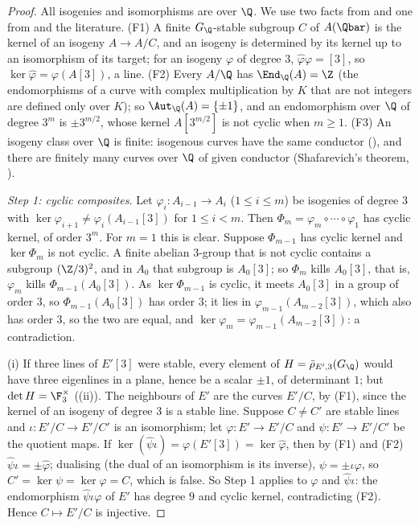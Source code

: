 \begin{proof}
All isogenies and isomorphisms are over $\Q$. We use two facts from  and one from  and the literature. (F1) A finite $G_\Q$-stable subgroup $C$ of $A(\Qbar)$ is the
kernel of an isogeny $A\to A/C$, and an isogeny is determined by its kernel up to an isomorphism of its target; for an isogeny $\varphi$ of degree $3$,
$\hat\varphi\varphi=[3]$, so $\ker\hat\varphi=\varphi(A[3])$, a line. (F2) Every $A/\Q$ has $\End_\Q(A)=\Z$ (the endomorphisms of a curve with complex
multiplication by $K$ that are not integers are defined only over $K$); so $\Aut_\Q(A)=\{\pm1\}$, and an endomorphism over $\Q$ of degree $3^m$ is
$\pm3^{m/2}$, whose kernel $A[3^{m/2}]$ is not cyclic when $m\ge1$. (F3) An isogeny class over $\Q$ is finite: isogenous curves have the same
conductor (), and there are finitely many curves over $\Q$ of given conductor (Shafarevich's theorem, \cite[Section IX.6]{SilvermanAEC}).

\emph{Step 1: cyclic composites.} Let $\varphi_i\colon A_{i-1}\to A_i$ ($1\le i\le m$) be isogenies of degree $3$ with $\ker\varphi_{i+1}\ne\varphi_i(A_{i-1}[3])$ for
$1\le i<m$. Then $\Phi_m=\varphi_m\circ\cdots\circ\varphi_1$ has cyclic kernel, of order $3^m$. For $m=1$ this is clear. Suppose $\Phi_{m-1}$ has cyclic
kernel and $\ker\Phi_m$ is not cyclic. A finite abelian $3$-group that is not cyclic contains a subgroup $(\Z/3)^2$, and in $A_0$ that subgroup is
$A_0[3]$; so $\Phi_m$ kills $A_0[3]$, that is, $\varphi_m$ kills $\Phi_{m-1}(A_0[3])$. As $\ker\Phi_{m-1}$ is cyclic, it meets $A_0[3]$ in a group of
order $3$, so $\Phi_{m-1}(A_0[3])$ has order $3$; it lies in $\varphi_{m-1}(A_{m-2}[3])$, which also has order $3$, so the two are equal, and
$\ker\varphi_m=\varphi_{m-1}(A_{m-2}[3])$: a contradiction.

(i) If three lines of $E'[3]$ were stable, every element of $H=\bar\rho_{E',3}(G_\Q)$ would have three eigenlines in a plane, hence be a scalar
$\pm1$, of determinant $1$; but $\det H=\F_3^\times$ ((ii)). The neighbours of $E'$ are the curves $E'/C$, by (F1), since the
kernel of an isogeny of degree $3$ is a stable line. Suppose $C\ne C'$ are stable lines and $\iota\colon E'/C\to E'/C'$ is an isomorphism; let
$\varphi\colon E'\to E'/C$ and $\psi\colon E'\to E'/C'$ be the quotient maps. If $\ker(\hat\psi\iota)=\varphi(E'[3])=\ker\hat\varphi$, then by (F1) and (F2)
$\hat\psi\iota=\pm\hat\varphi$; dualising (the dual of an isomorphism is its inverse), $\psi=\pm\iota\varphi$, so $C'=\ker\psi=\ker\varphi=C$, which is false. So
Step 1 applies to $\varphi$ and $\hat\psi\iota$: the endomorphism $\hat\psi\iota\varphi$ of $E'$ has degree $9$ and cyclic kernel, contradicting (F2). Hence
$C\mapsto E'/C$ is injective.


\end{proof}
